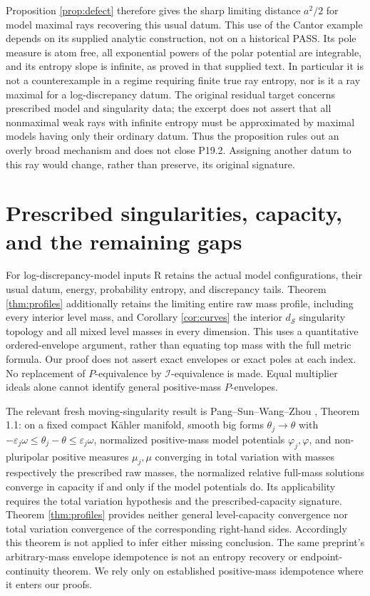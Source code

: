 \documentclass[11pt]{article}
\theoremstyle{remark}\newtheorem{remark}[theorem]{Remark}
\begin{document}
Proposition \ref{prop:defect} therefore gives the sharp limiting
distance $a^2/2$ for model maximal rays recovering this usual datum.
This use of the Cantor example depends on its supplied analytic
construction, not on a historical PASS. Its pole measure is atom
free, all exponential powers of the polar potential are integrable,
and its entropy slope is infinite, as proved in that supplied text.
In particular it is not a counterexample in a regime requiring finite
true ray entropy, nor is it a ray maximal for a log-discrepancy datum.
The original residual target concerns prescribed model and singularity
data; the excerpt does not assert that all nonmaximal weak rays with
infinite entropy must be approximated by maximal models having only
their ordinary datum. Thus the proposition rules out an overly broad
mechanism and does not close P19.2. Assigning another datum to this
ray would change, rather than preserve, its original signature.

\section{Prescribed singularities, capacity, and the remaining gaps}
For log-discrepancy-model inputs R retains the actual model
configurations, their usual datum, energy, probability entropy, and
discrepancy tails. Theorem \ref{thm:profiles} additionally retains
the limiting entire raw mass profile, including every interior level
mass, and Corollary \ref{cor:curves} the interior $d_{\mathcal S}$
singularity topology and all mixed level masses in every dimension.
This uses a quantitative ordered-envelope argument, rather than
equating top mass with the full metric formula.
Our proof does not assert exact envelopes or exact poles at each
index. No replacement of $P$-equivalence by
$\mathcal I$-equivalence is made. Equal multiplier ideals alone
cannot identify general positive-mass $P$-envelopes.

The relevant fresh moving-singularity result is Pang--Sun--Wang--Zhou
\cite{PSWZ}, Theorem 1.1: on a fixed compact K\"ahler manifold,
smooth big forms $\theta_j\to\theta$ with
$-\varepsilon_j\omega\leq\theta_j-\theta\leq\varepsilon_j\omega$,
normalized positive-mass model potentials $\varphi_j,\varphi$, and
non-pluripolar positive measures $\mu_j,\mu$ converging in total
variation with masses respectively the prescribed raw masses,
the normalized relative full-mass solutions converge in capacity
if and only if the model potentials do. Its applicability requires
the total variation hypothesis and the prescribed-capacity
signature. Theorem \ref{thm:profiles} provides neither general
level-capacity convergence nor total variation convergence of the
corresponding right-hand sides. Accordingly this theorem is not
applied to infer either missing conclusion. The same preprint's
arbitrary-mass envelope idempotence is not an entropy recovery or
endpoint-continuity theorem. We rely only on established
positive-mass idempotence where it enters our proofs.
\end{document}
